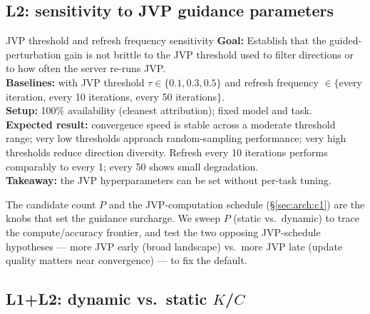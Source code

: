 \subsection{L2: sensitivity to JVP guidance parameters}
\label{sec:ablation:jvp}

\begin{plannedexp}{JVP threshold and refresh frequency sensitivity}
  \textbf{Goal:} Establish that the guided-perturbation gain is not
  brittle to the JVP threshold used to filter directions or to how
  often the server re-runs JVP.\\[3pt]
  \textbf{Baselines:} \sys{} with JVP threshold $\tau \in \{0.1, 0.3,
  0.5\}$ and refresh frequency $\in \{$every iteration, every 10
  iterations, every 50 iterations$\}$.\\[3pt]
  \textbf{Setup:} 100\% availability (cleanest attribution); fixed
  model and task.\\[3pt]
  \textbf{Expected result:} convergence speed is stable across a
  moderate threshold range; very low thresholds approach
  random-sampling performance; very high thresholds reduce direction
  diversity. Refresh every 10 iterations performs comparably to every
  1; every 50 shows small degradation.\\[3pt]
  \textbf{Takeaway:} the JVP hyperparameters can be set without
  per-task tuning.
\end{plannedexp}

The candidate count $P$ and the JVP-computation schedule
(\S\ref{sec:arch:c1}) are the knobs that set the guidance surcharge.
We sweep $P$ (static vs.\ dynamic) to trace the compute/accuracy
frontier, and test the two opposing JVP-schedule hypotheses --- more
JVP early (broad landscape) vs.\ more JVP late (update quality matters
near convergence) --- to fix the default. 

\subsection{L1+L2: dynamic vs.\ static $K$/$C$}
\label{sec:ablation:kc}

